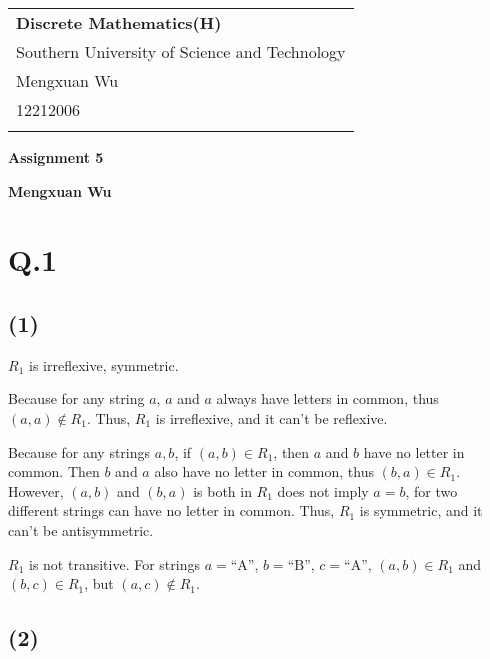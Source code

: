 \documentclass[a4paper,12pt]{article}
\begin{document}
\thispagestyle{empty} %

\begin{tabular}{p{15.5cm}}
{\large \bf Discrete Mathematics(H)} \\
Southern University of Science and Technology \\ Mengxuan Wu \\ 12212006 \\
\hline
\\
\end{tabular}

\vspace*{0.3cm} %

\begin{center}
	{\Large \bf Assignment 5}
	\vspace{2mm}

	{\bf Mengxuan Wu}
		
\end{center}  

\vspace{0.4cm}

\section*{Q.1}

\subsection*{(1)}

$R_1$ is irreflexive, symmetric.

Because for any string $a$, $a$ and $a$ always have letters in common, thus $(a, a) \not\in R_1$.
Thus, $R_1$ is irreflexive, and it can't be reflexive.

Because for any strings $a, b$, if $(a, b) \in R_1$, then $a$ and $b$ have no letter in common.
Then $b$ and $a$ also have no letter in common, thus $(b, a) \in R_1$.
However, $(a,b)$ and $(b,a)$ is both in $R_1$ does not imply $a = b$, for two different strings can have no letter in common.
Thus, $R_1$ is symmetric, and it can't be antisymmetric.

$R_1$ is not transitive.
For strings $a = \text{``A''}$, $b = \text{``B''}$, $c = \text{``A''}$, $(a, b) \in R_1$ and $(b, c) \in R_1$, but $(a, c) \not\in R_1$.

\subsection*{(2)}
\end{document}
